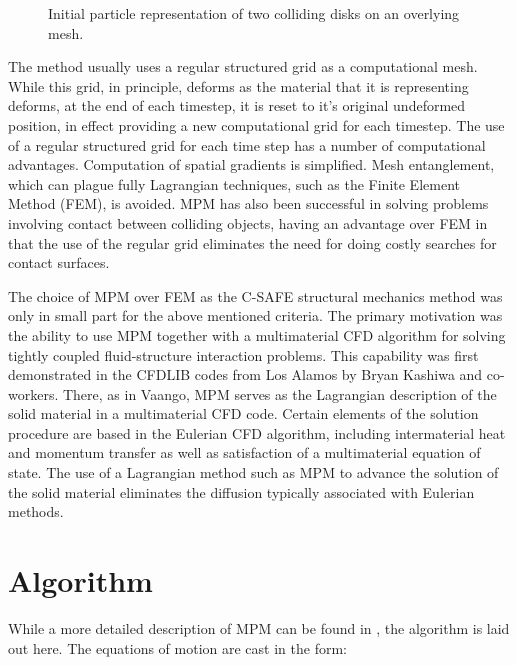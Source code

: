 \begin{figure}[h]
  \hspace{1.5in}
  \caption{\label{fig-disks_init} Initial particle representation of two
                                colliding disks on an overlying mesh.}
\end{figure}

The method usually uses a regular structured grid as a 
computational mesh.
While this grid, in principle, deforms as the material that it 
is representing
deforms, at the end of each timestep, it is reset to it's 
original undeformed
position, in effect providing a new computational grid for each 
timestep.
The use of a regular structured grid for each time step has a 
number of
computational advantages.  Computation of spatial gradients is 
simplified.
Mesh entanglement, which can plague fully Lagrangian techniques, 
such as
the Finite Element Method (FEM), is avoided.  MPM has also been 
successful
in solving problems involving contact between colliding objects, 
having an
advantage over FEM in that the use of the regular grid 
eliminates the
need for doing costly searches for contact surfaces\cite{bard}.

The choice of MPM over FEM as the C-SAFE structural mechanics method
was only in small part for the above mentioned criteria.  The
primary motivation was the ability to use MPM together with a multimaterial
CFD algorithm for solving tightly coupled fluid-structure interaction
problems.  This capability was first demonstrated in the CFDLIB
codes from Los Alamos by Bryan Kashiwa and co-workers.  There, as
in Vaango, MPM serves as the Lagrangian description of the solid
material in a multimaterial CFD code.  Certain elements of the
solution procedure are based in the Eulerian CFD algorithm, including
intermaterial heat and momentum transfer as well as satisfaction
of a multimaterial equation of state.  The use of a Lagrangian method
such as MPM to advance the solution of the solid material eliminates
the diffusion typically associated with Eulerian methods.

\section{Algorithm}

While a more detailed description of MPM can be found in 
\cite{sulskycpc},
the algorithm is laid out here.  The equations of motion are 
cast in the
form:

